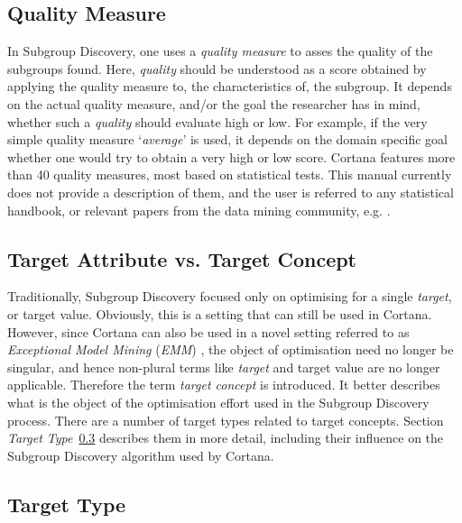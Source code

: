 \documentclass{article}
\begin{document}
\subsection{Quality Measure}
\label{preliminaries:quality-measure}
In Subgroup Discovery, one uses a \emph{quality measure} to asses the quality of the subgroups found.
Here, \emph{quality} should be understood as a score obtained by applying the quality measure to, the characteristics of, the subgroup.
It depends on the actual quality measure, and/or the goal the researcher has in mind, whether such a \emph{quality} should evaluate high or low.
For example, if the very simple quality measure `\emph{average}' is used, it depends on the domain specific goal whether one would try to obtain a very high or low score.
Cortana features more than 40 quality measures, most based on statistical tests.
This manual currently does not provide a description of them, and the user is referred to any statistical handbook, or relevant papers from the data mining community, e.g. \cite{shb,remauv}.



\subsection{Target Attribute vs. Target Concept}
\label{preliminaries:target-concept}
Traditionally, Subgroup Discovery focused only on optimising for a single \emph{target}, or target value.
Obviously, this is a setting that can still be used in Cortana.
However, since Cortana can also be used in a novel setting referred to as \emph{Exceptional Model Mining} (\emph{EMM}) \cite{emm,sdmbn}, the object of optimisation need no longer be singular, and hence non-plural terms like \emph{target} and target value are no longer applicable.
Therefore the term \emph{target concept} is introduced.
It better describes what is the object of the optimisation effort used in the Subgroup Discovery process.
There are a number of target types related to target concepts.
Section \emph{Target Type}~\ref{preliminaries:target-type} describes them in more detail, including their influence on the Subgroup Discovery algorithm used by Cortana.



\subsection{Target Type}
\label{preliminaries:target-type}
\end{document}
